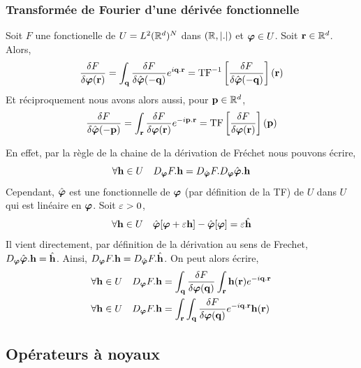 \documentclass[10pt]{article}
\begin{document}
\begin{multicols}{2}
\vspace*{11pt}

\subsubsection{Transformée de Fourier d'une dérivée fonctionnelle}

Soit $F$ une fonctionelle de $U = L^2(\mathbb{R}^d)^N$ dans $(\mathbb{R},|.|)$ et $\boldsymbol{ \varphi} \in U$.
Soit ${\bf r} \in \mathbb{R}^d$.
Alors, 
\begin{equation}
  \frac{\delta F}{\delta \boldsymbol{ \varphi}({\bf r})} = \int_{{\bf q}} \frac{\delta F}{\delta \hat{\boldsymbol{ \varphi}}(-{\bf q})} e^{i{\bf q}.{\bf r}} = \text{TF}^{-1} \left[ \frac{\delta F}{\delta \hat{\boldsymbol{ \varphi}}(-{\bf q})} \right]({\bf r}) 
\end{equation} 
Et réciproquement nous avons alors aussi, pour ${\bf p} \in \mathbb{R}^d$,  
\begin{equation}
  \frac{\delta F}{\delta \hat{\boldsymbol{ \varphi}}(-{\bf p})} = \int_{{\bf r}} \frac{\delta F}{\delta \boldsymbol{ \varphi}({\bf r})} e^{-i{\bf p}.{\bf r}} = \text{TF} \left[ \frac{\delta F}{\delta \boldsymbol{ \varphi}({\bf r})} \right]({\bf p}) 
\end{equation} 

\vspace*{11pt}
{\footnotesize 
\noindent
En effet, par la règle de la chaine de la dérivation de Fréchet nous pouvons écrire, 
\begin{equation}
  \forall {\bf h} \in U \quad D_{\boldsymbol{ \varphi}} F. {\bf h} = D_{\hat{\boldsymbol{ \varphi}}} F. D_{\boldsymbol{ \varphi}} \hat{\boldsymbol{ \varphi}}.{\bf h} 
\end{equation}
Cependant, $\hat{\boldsymbol{ \varphi}}$ est une fonctionnelle de $\boldsymbol{ \varphi}$ (par définition de la TF) de $U$ dans $U$ qui est linéaire en $\boldsymbol{ \varphi}$. Soit $\varepsilon >0$, 
\begin{equation}
  \forall {\bf h} \in U \quad \hat{\boldsymbol{ \varphi}}[\boldsymbol{ \varphi} + \varepsilon {\bf h}] - \hat{\boldsymbol{ \varphi}}[\boldsymbol{ \varphi}] = \varepsilon \hat{{\bf h}} 
\end{equation} 
Il vient directement, par définition de la dérivation au sens de Frechet, $D_{\boldsymbol{ \varphi}} \hat{\boldsymbol{ \varphi}} .{\bf h} = \hat{{\bf h}}$.  
Ainsi,  $D_{\boldsymbol{ \varphi}} F .{\bf h} = D_{\hat{\boldsymbol{ \varphi}}}F.\hat{{\bf h}}$.  On peut alors écrire, 
\begin{align}
  \forall {\bf h} \in U  \quad D_{\boldsymbol{ \varphi}} F .{\bf h} & = \int_{{\bf q}} \frac{\delta F}{\delta \boldsymbol{ \varphi}({\bf q})} \int_{{\bf r}} {\bf h}({\bf r}) e^{-i{\bf q}.{\bf r}} \\
  \forall {\bf h} \in U  \quad D_{\boldsymbol{ \varphi}} F .{\bf h} & = \int_{{\bf r}} \int_{{\bf q}} \frac{\delta F}{\delta \boldsymbol{ \varphi}({\bf q})} e^{-i{\bf q}.{\bf r} } {\bf h}({\bf r})
\end{align}
}



\subsection{Opérateurs à noyaux}


\end{multicols}
\end{document}
